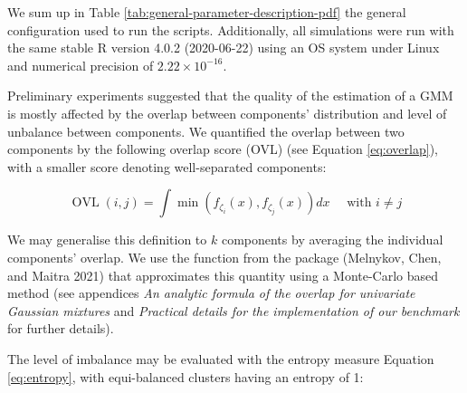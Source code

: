 We sum up in Table \ref{tab:general-parameter-description-pdf} the general configuration used to run the scripts. Additionally, all simulations were run with the same stable R version 4.0.2 (2020-06-22) using an OS system under Linux and numerical precision of \(2.22 \times 10^{-16}\).

\begin{table}[!h]

\caption{\label{tab:general-parameter-description-pdf}Global options shared by all the benchmarked packages.}
\centering
{}
\end{table}

Preliminary experiments suggested that the quality of the estimation of a
GMM is mostly affected by the overlap between components' distribution
and level of unbalance between components. We quantified the overlap between two components by the following overlap score (OVL) (see Equation \eqref{eq:overlap}), with a smaller score denoting well-separated components:

\begin{equation}
       \operatorname{OVL}(i, j) = \int \min (f_{\zeta_i} (x), f_{\zeta_j} (x)) dx \quad \text{ with } i \neq j
  \label{eq:overlap}
\end{equation}

We may generalise this definition to \(k\) components by averaging the
individual components' overlap. We use the function
 from the  package (Melnykov, Chen, and Maitra 2021) that approximates this quantity using a Monte-Carlo based method (see appendices \emph{An analytic formula of the overlap for univariate Gaussian mixtures} and \emph{Practical details for the implementation of our benchmark} for further details).

The level of imbalance may be evaluated with the entropy measure Equation \eqref{eq:entropy}, with equi-balanced clusters having an entropy of 1:

